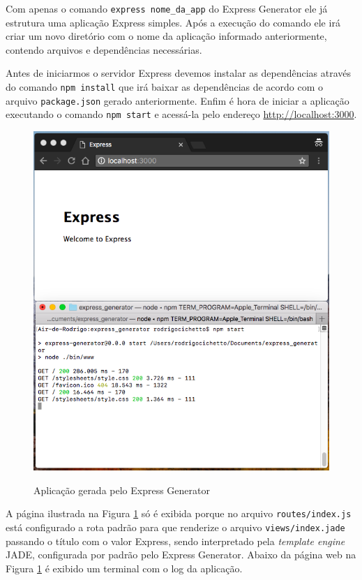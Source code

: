 \documentclass[
	12pt,				%
	openright,			%
	twoside,			%
	a4paper,			%
	english,			%
	brazil				%
	]{abntex2}
\begin{document}
\begin{anexosenv}
Com apenas o comando \verb|express nome_da_app| do Express Generator ele já estrutura uma aplicação Express simples. Após a execução do comando ele irá criar um novo diretório com o nome da aplicação informado anteriormente, contendo arquivos e dependências necessárias. 

Antes de iniciarmos o servidor Express devemos instalar as dependências através do comando \verb|npm install| que irá baixar as dependências de acordo com o arquivo \verb|package.json| gerado anteriormente. Enfim é hora de iniciar a aplicação executando o comando \verb|npm start| e acessá-la pelo endereço \href{http://localhost:3000}{http://localhost:3000}.

\begin{figure}[h]
	\centering

	\caption{Aplicação gerada pelo Express Generator} \label{fig:ExpressGeneratorApp}
    \includegraphics[scale=0.5]{express-generator-app} \\

\end{figure}

A página ilustrada na Figura \ref{fig:ExpressGeneratorApp} só é exibida porque no arquivo \verb|routes/index.js| está configurado a rota padrão para que renderize o arquivo \verb|views/index.jade| passando o título com o valor Express, sendo interpretado pela \textit{template engine} JADE, configurada por padrão pelo Express Generator. Abaixo da página web na Figura \ref{fig:ExpressGeneratorApp} é exibido um terminal com o log da aplicação.


\end{anexosenv}
\end{document}
